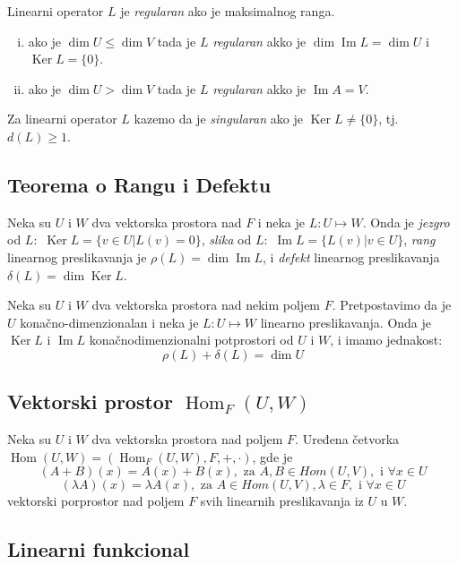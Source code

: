 \documentclass[12p,a4paper]{article}
\DeclareMathOperator{\Ker}{Ker}
\DeclareMathOperator{\Ima}{Im}
\DeclareMathOperator{\Hom}{Hom}
\begin{document}
\begin{multicols}{2}
    Linearni operator $L$ je \textit{regularan} ako je maksimalnog ranga.
    \begin{enumerate}[(i)]
        \itemsep0em
        \item ako je $\dim U \leq \dim V$ tada je $L$ \textit{regularan} 
            akko je $\dim \Ima L = \dim U$ i $\Ker L = \{0\}$.
        \item ako je $\dim U > \dim V$ tada je $L$ \textit{regularan} 
            akko je $\Ima A = V$.
    \end{enumerate}
    Za linearni operator $L$ kazemo da je \textit{singularan} ako je 
    $\Ker L \neq \{0\}$, tj.\ $d(L) \geq 1$.


\subsection{Teorema o Rangu i Defektu}

    Neka su $U$ i $W$ dva vektorska prostora nad $F$ i neka je 
    $L : U \mapsto W$. Onda je \textit{jezgro} od $L$:\ 
    $\Ker L= \{v \in U | L(v) = 0 \}$, \textit{slika} od $L$:\ 
    $\Ima L = \{ L(v) | v \in U\}$, \textit{rang} linearnog preslikavanja je 
    $\rho (L) = \dim \Ima L$, i \textit{defekt} linearnog preslikavanja 
    $\delta(L) = \dim \Ker L$.

    Neka su $U$ i $W$ dva vektorska prostora nad nekim poljem $F$. 
    Pretpostavimo da je $U$ konačno-dimenzionalan i neka je 
    $L : U \mapsto W$ linearno preslikavanja. Onda je $\Ker L$ i $\Ima L$ 
    konačnodimenzionalni potprostori od $U$ i $W$, i imamo jednakost:
    \[\rho (L) + \delta (L) = \dim U \]

\subsection{Vektorski prostor $\Hom_F (U, W)$}

    Neka su $U$ i $W$ dva vektorska prostora nad poljem $F$. Uređena četvorka 
    $\Hom(U, W) = (\Hom_F(U, W), F, +, \cdot)$, gde je
    \[ (A + B) (x) = A(x) + B(x), \text{ za } A, B \in Hom(U, V), 
    \text { i } \forall x \in U\]
    \[ (\lambda A) (x) = \lambda A(x), \text{ za } A \in Hom(U, V), 
    \lambda \in F, \text { i } \forall x \in U\]
    vektorski porprostor nad poljem $F$ svih linearnih preslikavanja 
    iz $U$ u $W$.

\subsection{Linearni funkcional}
    

\end{multicols}
\end{document}
